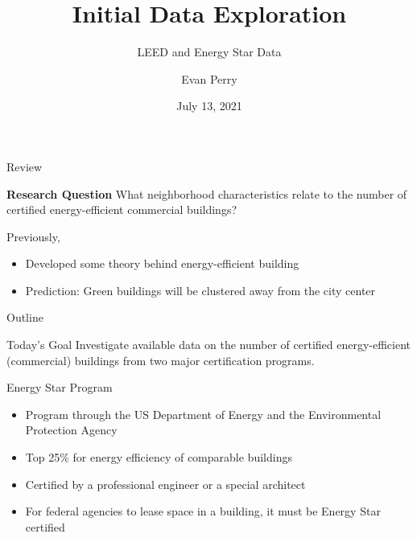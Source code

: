 \documentclass[11pt]{beamer}
\title{Initial Data Exploration}
\subtitle{LEED and Energy Star Data}
\institute{Spellman Program}
\author{Evan Perry}
\date{July 13, 2021}
\begin{document}
\maketitlepage

\begin{frame}{Review}

\begin{exampleblock}{\large\textbf{Research Question}}
What neighborhood characteristics relate to the number of certified energy-efficient commercial buildings?
\end{exampleblock}

\vfill
Previously,
\begin{itemize}
	\item Developed some theory behind energy-efficient building
	\item Prediction: Green buildings will be clustered away from the city center 
\end{itemize}

\end{frame}


\begin{frame}{Outline}

\begin{block}{Today's Goal}
Investigate available data on the number of certified energy-efficient (commercial) buildings from two major certification programs.
\end{block}

	\tableofcontents[hideallsubsections]
\end{frame}


\begin{frame}{Energy Star Program}

\begin{itemize}
	\item Program through the US Department of Energy and the Environmental Protection Agency
	\vfill

	\item Top 25\% for energy efficiency of comparable buildings
	\vfill
	
	\item Certified by a professional engineer or a special architect
	
	\vfill
	\item For federal agencies to lease space in a building, it must be Energy Star certified
\end{itemize}


\end{frame}
\end{document}
